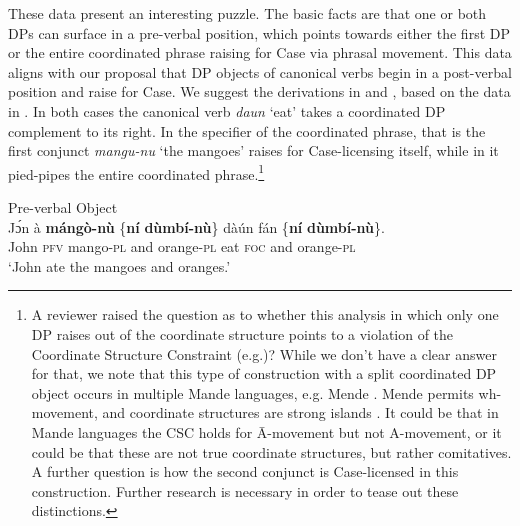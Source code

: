 \documentclass[output=paper,colorlinks,citecolor=brown,draftmode
]{langscibook}
\begin{document}
These data present an interesting puzzle. The basic facts are that one or both DPs can surface in a pre-verbal position, which points towards either the first DP or the entire coordinated phrase raising for Case via phrasal movement. This data aligns with our proposal that DP objects of canonical verbs begin in a post-verbal position and raise for Case. We suggest the derivations in 
 and , based on the data in . In both cases the canonical verb \textit{daun} ‘eat’ takes a coordinated DP complement to its right. In  the specifier of the coordinated phrase, that is the first conjunct \textit{mangu-nu} ‘the mangoes’ raises for Case-licensing itself, while in  it pied-pipes the entire coordinated phrase.\footnote{A reviewer raised the question as to whether this analysis in which only one DP raises out of the coordinate structure points to a violation of the Coordinate Structure Constraint (e.g.)? While we don’t have a clear answer for that, we note that this type of construction with a split coordinated DP object occurs in multiple Mande languages, e.g. Mende \citep{SmithDiss}. Mende permits wh-movement, and coordinate structures are strong islands \citep{smith2024absence}. It could be that in Mande languages the CSC holds for Ā-movement but not A-movement, or it could be that these are not true coordinate structures, but rather comitatives. 
A further question is how the second conjunct is Case-licensed in this construction. Further research is necessary in order to tease out these distinctions.}


\ea \label{ex:Coord for Tree}
Pre-verbal Object \\
\gll Jɔ́n à \textbf{mángò-nù} \{\textbf{ní} \textbf{dùmbí-nù}\} dàún fán \{\textbf{ní} \textbf{dùmbí-nù}\}. \\
John \textsc{pfv} mango-\textsc{pl} and orange-\textsc{pl} eat \textsc{foc} and orange-\textsc{pl}\\
\glt `John ate the mangoes and oranges.'
\z
\end{document}
